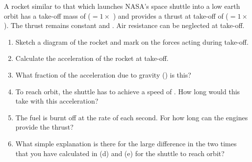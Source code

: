
\begin{problem}[Robin8]
{A rocket similar to that which launches NASA’s space shuttle into a low earth orbit has a take-off mass of  ($ =  1\times$ ) and provides a thrust at take-off of  ($ = 1\times$). The thrust remains constant and .  Air resistance can be neglected at take-off. 
\begin{enumerate}
	\item Sketch a diagram of the rocket and mark on the forces acting during take-off.
	\item Calculate the acceleration of the rocket at take-off.
	\item What fraction of the acceleration due to gravity () is this?
	\item To reach orbit, the shuttle has to achieve a speed of .  How long would this take with this acceleration?
	\item The fuel is burnt off at the rate of  each second.  For how long can the engines provide the thrust?
	\item What simple explanation is there for the large difference in the two times that you have calculated in (d) and (e) for the shuttle to reach orbit?
\end{enumerate}
}
{}
{}
\end{problem}
